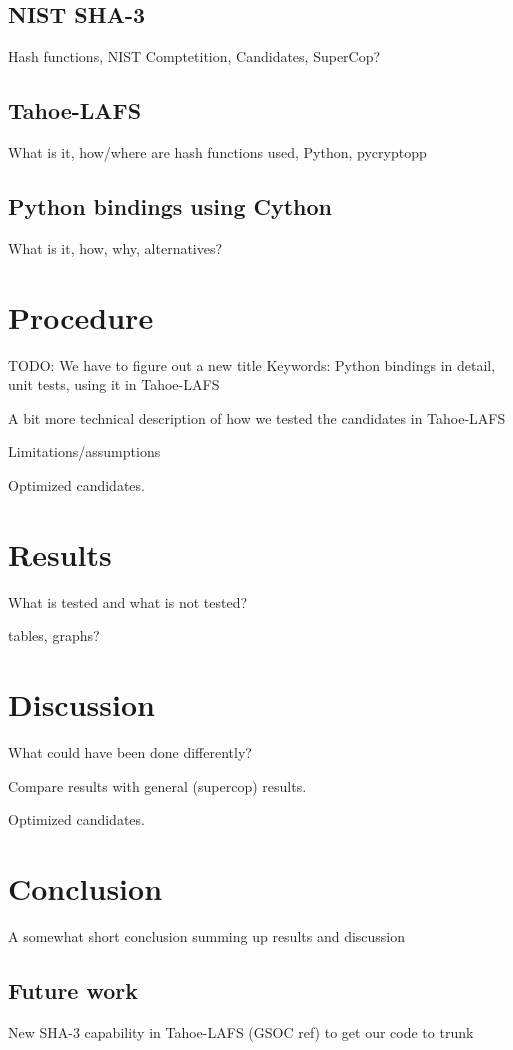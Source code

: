 \documentclass[english,12pt,a4paper]{book}
\begin{document}
\section{NIST SHA-3}

Hash functions, NIST Comptetition, Candidates, SuperCop?

\section{Tahoe-LAFS}

What is it, how/where are hash functions used, Python, pycryptopp

\section{Python bindings using Cython}

What is it, how, why, alternatives?


\chapter{Procedure}

TODO: We have to figure out a new title
Keywords: Python bindings in detail, unit tests, using it in Tahoe-LAFS

A bit more technical description of how we tested the candidates in Tahoe-LAFS

Limitations/assumptions

Optimized candidates.


\chapter{Results}

What is tested and what is not tested?

tables, graphs?


\chapter{Discussion}

What could have been done differently?

Compare results with general (supercop) results.

Optimized candidates.

\cite{nistround2}


\chapter{Conclusion}

A somewhat short conclusion summing up results and discussion

\section{Future work}

New SHA-3 capability in Tahoe-LAFS (GSOC ref) to get our code to trunk





\appendix
\appendixpage
\addappheadtotoc

\end{document}

